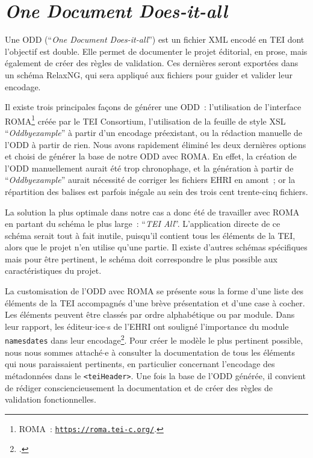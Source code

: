 
\section{\textit{One Document Does-it-all}}

Une ODD (\enquote{\textit{One Document Does-it-all}}) est un fichier XML encodé en TEI dont l'objectif est double. Elle permet de documenter le projet éditorial, en prose, mais également de créer des règles de validation. Ces dernières seront exportées dans un schéma RelaxNG, qui sera appliqué aux fichiers pour guider et valider leur encodage.

Il existe trois principales façons de générer une ODD~: l'utilisation de l'interface ROMA\footnote{ROMA~: \texttt{\href{https://roma.tei-c.org/}{https://roma.tei-c.org/}}.} créée par le TEI Consortium, l'utilisation de la feuille de style XSL \enquote{\textit{Oddbyexample}} à partir d'un encodage préexistant, ou la rédaction manuelle de l'ODD à partir de rien. Nous avons rapidement éliminé les deux dernières options et choisi de générer la base de notre ODD avec ROMA. En effet, la création de l'ODD manuellement aurait été trop chronophage, et la génération à partir de \enquote{\textit{Oddbyexample}} aurait nécessité de corriger les fichiers EHRI en amont~; or la répartition des balises est parfois inégale au sein des trois cent trente-cinq fichiers.  

La solution la plus optimale dans notre cas a donc été de travailler avec ROMA en partant du schéma le plus large~: \enquote{\textit{TEI All}}. L'application directe de ce schéma serait tout à fait inutile, puisqu'il contient tous les éléments de la TEI, alors que le projet n'en utilise qu'une partie. Il existe d'autres schémas spécifiques mais pour être pertinent, le schéma doit correspondre le plus possible aux caractéristiques du projet.  

La customisation de l'ODD avec ROMA se présente sous la forme d'une liste des éléments de la TEI accompagnés d'une brève présentation et d'une case à cocher. Les éléments peuvent être classés par ordre alphabétique ou par module. Dans leur rapport, les éditeur$\cdot$ice$\cdot$s de l'EHRI ont souligné l'importance du module \texttt{namesdates} dans leur encodage\footcite{Ehri2018}. Pour créer le modèle le plus pertinent possible, nous nous sommes attaché$\cdot$e à consulter la documentation de tous les éléments qui nous paraissaient pertinents, en particulier concernant l'encodage des métadonnées dans le \texttt{<teiHeader>}. Une fois la base de l'ODD générée, il convient de rédiger consciencieusement la documentation et de créer des règles de validation fonctionnelles.  



